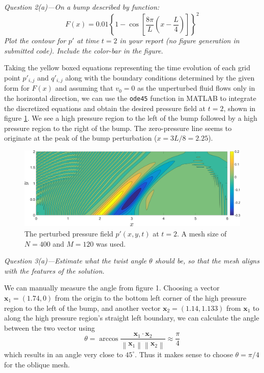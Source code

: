\documentclass[11pt]{article}
\begin{document}
\begin{tcolorbox}
  \textit{Question 2(a)---On a bump described by function:}
  \begin{equation*}
    F(x) = 0.01 \left\{ 1 - \cos \left[ \frac{8\pi}{L} \left( x - \frac{L}{4} \right) \right] \right\}^2
  \end{equation*}
  \textit{Plot the contour for $p'$ at time $t=2$ in your report (no figure
  generation in submitted code). Include the color-bar in the figure.}
\end{tcolorbox}
Taking the yellow boxed equations representing the time evolution of each grid point $p'_{i,j}$ and $q'_{i,j}$ along with the boundary conditions determined by the given form for $F(x)$ and assuming that $v_0=0$ as the unperturbed fluid flows only in the horizontal direction, we can use the \texttt{ode45} function in MATLAB to integrate the discretized equations and obtain the desired pressure field at $t=2$, shown in figure \ref{fig:pp_q2_contourf}. We see a high pressure region to the left of the bump followed by a high pressure region to the right of the bump. The zero-pressure line seems to originate at the peak of the bump perturbation ($x = 3L/8 = 2.25$). \\

\begin{figure}
  \centering
  \includegraphics[width=\textwidth]{pp_q2_contourf.png}
  \caption{The perturbed pressure field $p'(x,y,t)$ at $t=2$. A mesh size of $N=400$ and $M=120$ was used.}
  \label{fig:pp_q2_contourf}
\end{figure}

\begin{tcolorbox}
  \textit{Question 3(a)---Estimate what the twist angle $\theta$ should be, so that the mesh aligns with the features of the solution.}
\end{tcolorbox}
We can manually measure the angle from figure 1. Choosing a vector $\mathbf{x}_1 = (1.74, 0)$ from the origin to the bottom left corner of the high pressure region to the left of the bump, and another vector $\mathbf{x}_2 = (1.14, 1.133)$ from $\mathbf{x}_1$ to along the high pressure region's straight left boundary, we can calculate the angle between the two vector using
\begin{equation*}
  \theta = \arccos \frac{\mathbf{x}_1 \cdot \mathbf{x}_2}{\left\lVert\mathbf{x}_1\right\rVert \left\lVert\mathbf{x}_2\right\rVert} \approx \frac{\pi}{4}
\end{equation*}
which results in an angle very close to $45^\circ$. Thus it makes sense to choose $\theta = \pi/4$ for the oblique mesh. \\
\end{document}
